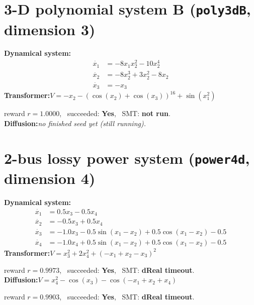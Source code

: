 \documentclass[11pt]{article}
\begin{document}
\section*{3-D polynomial system B \quad (\texttt{poly3dB}, dimension 3)}
\textbf{Dynamical system:}
\begin{align*}
\dot{x_{1}} &= - 8 x_{1} x_{2}^{2} - 10 x_{2}^{4} \\
\dot{x_{2}} &= - 8 x_{2}^{3} + 3 x_{2}^{2} - 8 x_{2} \\
\dot{x_{3}} &= - x_{3} 
\end{align*}
\textbf{Transformer:}\quad $V = - x_{2} - \left(\cos{\left(x_{2} \right)} + \cos{\left(x_{3} \right)}\right)^{16} + \sin{\left(x_{1}^{2} \right)}$
\par\noindent\hspace{1em}reward $r=1.0000$, \ succeeded: \textbf{Yes}, \ SMT: \textbf{not run}.\\[0.5ex]
\textbf{Diffusion:}\quad \emph{no finished seed yet (still running).}\\[1ex]
\section*{2-bus lossy power system \quad (\texttt{power4d}, dimension 4)}
\textbf{Dynamical system:}
\begin{align*}
\dot{x_{1}} &= 0.5 x_{3} - 0.5 x_{4} \\
\dot{x_{2}} &= - 0.5 x_{3} + 0.5 x_{4} \\
\dot{x_{3}} &= - 1.0 x_{3} - 0.5 \sin{\left(x_{1} - x_{2} \right)} + 0.5 \cos{\left(x_{1} - x_{2} \right)} - 0.5 \\
\dot{x_{4}} &= - 1.0 x_{4} + 0.5 \sin{\left(x_{1} - x_{2} \right)} + 0.5 \cos{\left(x_{1} - x_{2} \right)} - 0.5 
\end{align*}
\textbf{Transformer:}\quad $V = x_{3}^{2} + 2 x_{4}^{2} + \left(- x_{1} + x_{2} - x_{3}\right)^{2}$
\par\noindent\hspace{1em}reward $r=0.9973$, \ succeeded: \textbf{Yes}, \ SMT: \textbf{dReal timeout}.\\[0.5ex]
\textbf{Diffusion:}\quad $V = x_{4}^{2} - \cos{\left(x_{3} \right)} - \cos{\left(- x_{1} + x_{2} + x_{4} \right)}$
\par\noindent\hspace{1em}reward $r=0.9903$, \ succeeded: \textbf{Yes}, \ SMT: \textbf{dReal timeout}.\\[1ex]
\end{document}
